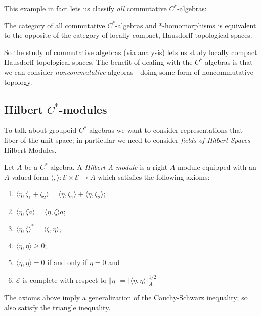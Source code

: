 This example in fact lets us classify \textit{all} commutative $C^{*}$-algebras:

\begin{theorem}
The category of all commutative $C^{*}$-algebras and *-homomorphisms is equivalent to the opposite of the category of locally compact, Hausdorff topological spaces.
\end{theorem}

So the study of commutative algebras (via analysis) lets us study locally compact Hausdorff topological spaces. The benefit of dealing with the $C^{*}$-algebras is that we can consider \textit{noncommutative} algebras - doing some form of noncommutative topology.

\subsection{Hilbert $C^{*}$-modules}
To talk about groupoid $C^{*}$-algebras we want to consider representations that fiber of the unit space; in particular we need to consider \textit{fields of Hilbert Spaces} - Hilbert Modules.

\begin{definition}
Let $A$ be a $C^{*}$-algebra. A \textit{Hilbert A-module}  is a right $A$-module equipped with an $A$-valued form $\langle , \rangle: \mathscr{E} \times \mathscr{E} \rightarrow A$ which satisfies the following axioms:
\begin{enumerate}
\item $\langle \eta ,\zeta_{1} + \zeta_{2} \rangle = \langle \eta , \zeta_{1}\rangle + \langle \eta ,\zeta_{2} \rangle$;
\item $\langle \eta , \zeta a \rangle = \langle \eta ,\zeta \rangle a$;
\item $\langle \eta , \zeta \rangle^{*} = \langle \zeta ,\eta \rangle$;
\item $\langle \eta, \eta \rangle \geq 0$;
\item $\langle \eta ,\eta  \rangle = 0 $ if and only if $ \eta = 0$ and
\item $\mathscr{E}$ is complete with respect to $\Vert \eta \Vert = \Vert \langle \eta , \eta \rangle \Vert_{A}^{1/2}$
\end{enumerate}
\end{definition}

\begin{remark}
The axioms above imply a generalization of the Cauchy-Schwarz inequality; so also satisfy the triangle inequality.
\end{remark}

